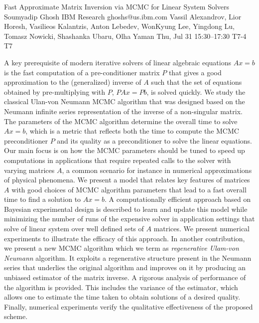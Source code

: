 \begin{talk}
  {Fast Approximate Matrix Inversion via MCMC for Linear System Solvers}%
  {Soumyadip Ghosh}%
  {IBM Research}%
  {ghoshs@us.ibm.com}%
  {Vassil Alexandrov,  Lior Horesh,  Vasilieos Kalantzis,  Anton Lebedev,  WonKyung Lee,  Yingdong Lu,  Tomasz Nowicki,  Shashanka Ubaru, Olha Yaman}%
  {}%
  {Thu, Jul 31 15:30–17:30}%
  {T7-4}%
  {T7}%
  
				
			
A key prerequisite of modern iterative solvers of linear algebraic equations $Ax=b$ is the fast computation of a pre-conditioner matrix $P$ that gives a good approximation to the (generalized) inverse of $A$ such that the set of equations obtained by pre-multiplying with $P$, $PAx=Pb$, is solved quickly. 
We study the classical Ulan-von Neumann MCMC algorithm that was designed based on the Neumann infinite series representation of the inverse of a non-singular matrix. The parameters of the MCMC algorithm determine the overall time to solve $Ax=b$, which is a metric that 
reflects both the time to compute the MCMC preconditioner $P$ and its quality as a preconditioner to solve the linear equations. Our main focus is on how the MCMC parameters should be tuned to speed up computations in applications that require repeated calls to the solver with varying matrices $A$, a common scenario for instance in numerical approximations of physical phenomena. 
We present a model that relates key features of matrices $A$ with good choices of MCMC algorithm parameters that lead to a fast overall time to find a solution to $Ax=b$. A computationally efficient approach based on Bayesian experimental design is described to learn and update this model while minimizing the number of runs of the expensive solver in application settings that solve of linear system over well defined sets of $A$ matrices. We present numerical experiments to illustrate the efficacy of this approach.
In another contribution, we present a new MCMC algorithm which we term as \emph{regenerative Ulam-von Neumann} algorithm. It exploits a regenerative structure present in the Neumann series that underlies the original algorithm and improves on it by producing an unbiased estimator of the matrix inverse. A rigorous analysis of performance of the algorithm is provided. This includes the variance of the estimator, which allows one to estimate the time taken to obtain solutions of a desired quality. Finally, numerical experiments verify the qualitative effectiveness of the proposed scheme. 

\end{talk}

